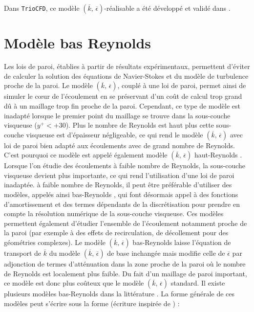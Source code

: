 Dans \texttt{TrioCFD}, ce mod\`ele $(\overline{k},\,\overline{\epsilon})$-\og r\'ealisable \fg{}
a \'et\'e d\'evelopp\'e et valid\'e dans \cite{Angeli_Leterrier_keps-real_NT2018}.


\section{Mod\`ele \og bas Reynolds \fg{}}

Les lois de paroi, \'etablies \`a partir de r\'esultats exp\'erimentaux, permettent
d\textquoteright \'eviter de calculer la solution des \'equations de Navier-Stokes
et du mod\`ele de turbulence proche de la paroi. Le mod\`ele $(\overline{k},\,\overline{\epsilon})$,
coupl\'e \`a une loi de paroi, permet ainsi de simuler le c\oe ur de
l\textquoteright \'ecoulement en se pr\'eservant d\textquoteright un co\^ut
de calcul trop grand d\^u \`a un maillage trop fin proche de la paroi.
Cependant, ce type de mod\`ele est inadapt\'e lorsque le premier point
du maillage se trouve dans la sous-couche visqueuse ($y^{+}<+30$).
Plus le nombre de Reynolds est haut plus cette sous-couche visqueuse
est d'\'epaisseur n\'egligeable, ce qui rend le mod\`ele $(\overline{k},\,\overline{\epsilon})$
avec loi de paroi bien adapt\'e aux \'ecoulements avec de grand nombre
de Reynolds. C\textquoteright est pourquoi ce mod\`ele est appel\'e \'egalement
mod\`ele $(\overline{k},\,\overline{\epsilon})$ \og haut-Reynolds \fg{}.
Lorsque l\textquoteright on \'etudie des \'ecoulements \`a faible nombre
de Reynolds, la sous-couche visqueuse devient plus importante, ce
qui rend l\textquoteright utilisation d'une loi de paroi inadapt\'ee.
\`a faible nombre de Reynolds, il peut \^etre pr\'ef\'erable d\textquoteright utiliser
des mod\`eles, appel\'es ainsi \og bas-Reynolds \fg{}, qui font d\'esormais
appel \`a des fonctions d\textquoteright amortissement et des termes
d\'ependants de la discr\'etisation pour prendre en compte la r\'esolution
num\'erique de la sous-couche visqueuse. Ces mod\`eles permettent \'egalement
d\textquoteright \'etudier l\textquoteright ensemble de l\textquoteright \'ecoulement
notamment proche de la paroi (par exemple \`a des effets de recirculation,
de d\'ecollement pour des g\'eom\'etries complexes). Le mod\`ele $(\overline{k},\,\overline{\epsilon})$
bas-Reynolds laisse l\textquoteright \'equation de transport de $\overline{k}$
du mod\`ele $(\overline{k},\,\overline{\epsilon})$ de base inchang\'ee
mais modifie celle de $\overline{\epsilon}$ par adjonction de termes
d\textquoteright att\'enuation dans la zone proche de la paroi o\`u le
nombre de Reynolds est localement plus faible. Du fait d\textquoteright un
maillage de paroi important, ce mod\`ele est donc plus co\^uteux que le
mod\`ele $(\overline{k},\,\overline{\epsilon})$ standard. Il existe
plusieurs mod\`eles bas-Reynolds dans la litt\'erature \cite{Launder-Sharma_LettHMT1974,Launder-Spalding_NumCompTurbFlow1974,Jones-Launder_IJHMT1972,Lam-Bremhorst_JFE1981}.
La forme g\'en\'erale de ces mod\`eles peut s'\'ecrire sous la forme (\'ecriture
inspir\'ee de \cite{Jones-Launder_IJHMT1972}) :


